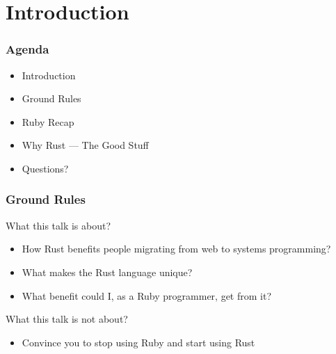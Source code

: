 \section{Introduction}
\label{sec:introduction}

\begin{frame}
  \frametitle{Agenda}
  \begin{itemize}
  \item Introduction
  \item Ground Rules
  \item Ruby Recap
  \item Why Rust --- The Good Stuff
  \item Questions?
  \end{itemize}
\end{frame}

\begin{frame}
  \frametitle{Ground Rules}
  What this talk is about?
  \begin{itemize}
  \item How Rust benefits people migrating from web to systems programming?
  \item What makes the Rust language unique?
  \item What benefit could I, as a Ruby programmer, get from it?
  \end{itemize}
  What this talk is not about?
  \begin{itemize}
  \item Convince you to stop using Ruby and start using Rust
  \end{itemize}
\end{frame}
